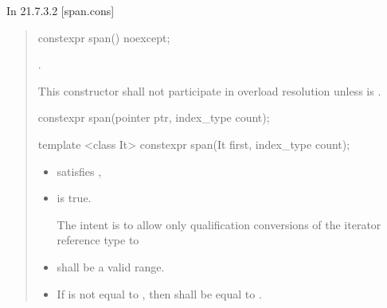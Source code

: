 \documentclass{wg21}
\begin{document}
In 21.7.3.2 [span.cons]

\begin{quote}


\begin{itemdecl}
    constexpr span() noexcept;
\end{itemdecl}
\begin{itemdescr}
    \pnum
    \ensures
    .

    \pnum
    \remarks
    This constructor shall not participate in overload resolution
    unless  is .
\end{itemdescr}
\begin{removedblock}
\begin{itemdecl}
constexpr span(pointer ptr, index_type count);
\end{itemdecl}
\end{removedblock}
\begin{addedblock}
\begin{itemdecl}
template <class It>
constexpr span(It first, index_type count);
\end{itemdecl}
\end{addedblock}
\begin{itemdescr}
    \begin{addedblock}
    \pnum
    \constraints
    \begin{itemize}
    	\item {} satisfies ,
    	\item {} is true.
    	 \begin{note}The intent is to allow only qualification conversions of the iterator reference type to  \end{note}
    \end{itemize}
    \end{addedblock}

    \expects
\begin{itemize}
    \item {} shall be a valid range.
    \item If  is not equal to ,
    then  shall be equal to .
\end{itemize}
    


\end{itemdescr}
\end{quote}
\end{document}
